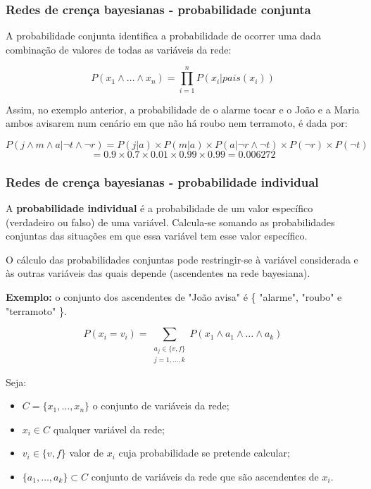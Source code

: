 \documentclass{article}
\begin{document}
\pagebreak

\subsubsection{Redes de crença bayesianas - probabilidade conjunta}

A probabilidade conjunta identifica a probabilidade de ocorrer uma dada
combinação de valores de todas as variáveis da rede:

\[ P(x_1 \wedge \dots \wedge x_n) = \prod_{i=1}^{n} P(x_i | pais(x_i)) \]

Assim, no exemplo anterior, a probabilidade de o alarme tocar e o João e a
Maria ambos avisarem num cenário em que não há roubo nem terramoto, é
dada por:

\[ P(j \wedge m \wedge a | \neg t \wedge \neg r) = P(j | a) \times P(m | a) \times P(a | \neg r \wedge \neg t) \times P(\neg r) \times P(\neg t) \]
\[ = 0.9 \times 0.7 \times 0.01 \times 0.99 \times 0.99 = 0.006272 \]

\subsubsection{Redes de crença bayesianas - probabilidade individual}

A \textbf{probabilidade individual} é a probabilidade de um
valor específico (verdadeiro ou falso) de uma variável.
Calcula-se somando as probabilidades conjuntas das
situações em que essa variável tem esse valor específico.

O cálculo das probabilidades conjuntas pode restringir-se à variável considerada e às outras variáveis das quais
depende (ascendentes na rede bayesiana).

\vspace{2mm}

\begin{flushleft}
  \textbf{Exemplo:} o conjunto dos ascendentes de "João avisa"
  é \{ "alarme", "roubo" e "terramoto" \}.
\end{flushleft}

\[ P(x_i = v_i) = \sum_{\substack{a_j \in \{v,f\}\\ j=1,\dots,k}} P(x_1 \wedge a_1 \wedge \dots \wedge a_k) \]

Seja:
\begin{itemize}
  \item $C = \{ x_1, \dots, x_n \}$ o conjunto de variáveis da rede;
  \item $x_i \in C$ qualquer variável da rede;
  \item $v_i \in \{v, f\}$ valor de $x_i$ cuja probabilidade se pretende calcular;
  \item $\{a_1, \dots, a_k\} \subset C$ conjunto de variáveis da rede que são ascendentes de $x_i$. 
\end{itemize}
\end{document}
